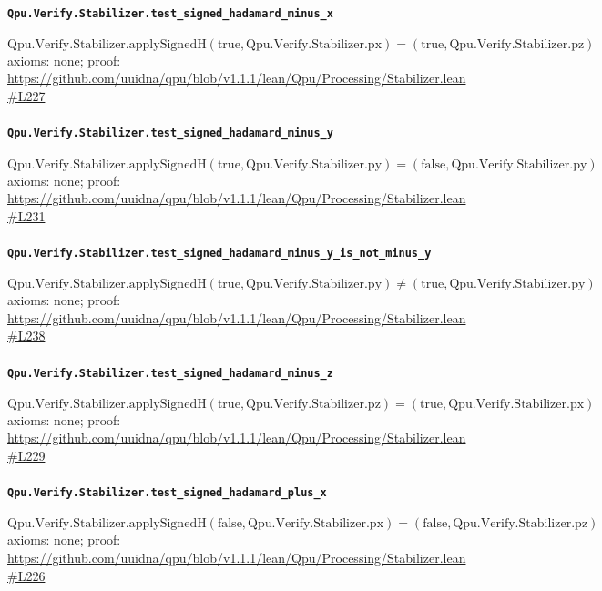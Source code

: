 \documentclass[11pt]{article}
\begin{document}
\paragraph{\texttt{Qpu.Verify.Stabilizer.test\_signed\_hadamard\_minus\_x}}
\[ \mathrm{Qpu.Verify.Stabilizer.applySignedH} (\mathrm{true}, \mathrm{Qpu.Verify.Stabilizer.px}) = (\mathrm{true}, \mathrm{Qpu.Verify.Stabilizer.pz}) \]
\noindent axioms: none; proof: \url{https://github.com/uuidna/qpu/blob/v1.1.1/lean/Qpu/Processing/Stabilizer.lean\#L227}

\paragraph{\texttt{Qpu.Verify.Stabilizer.test\_signed\_hadamard\_minus\_y}}
\[ \mathrm{Qpu.Verify.Stabilizer.applySignedH} (\mathrm{true}, \mathrm{Qpu.Verify.Stabilizer.py}) = (\mathrm{false}, \mathrm{Qpu.Verify.Stabilizer.py}) \]
\noindent axioms: none; proof: \url{https://github.com/uuidna/qpu/blob/v1.1.1/lean/Qpu/Processing/Stabilizer.lean\#L231}

\paragraph{\texttt{Qpu.Verify.Stabilizer.test\_signed\_hadamard\_minus\_y\_is\_not\_minus\_y}}
\[ \mathrm{Qpu.Verify.Stabilizer.applySignedH} (\mathrm{true}, \mathrm{Qpu.Verify.Stabilizer.py}) \ne (\mathrm{true}, \mathrm{Qpu.Verify.Stabilizer.py}) \]
\noindent axioms: none; proof: \url{https://github.com/uuidna/qpu/blob/v1.1.1/lean/Qpu/Processing/Stabilizer.lean\#L238}

\paragraph{\texttt{Qpu.Verify.Stabilizer.test\_signed\_hadamard\_minus\_z}}
\[ \mathrm{Qpu.Verify.Stabilizer.applySignedH} (\mathrm{true}, \mathrm{Qpu.Verify.Stabilizer.pz}) = (\mathrm{true}, \mathrm{Qpu.Verify.Stabilizer.px}) \]
\noindent axioms: none; proof: \url{https://github.com/uuidna/qpu/blob/v1.1.1/lean/Qpu/Processing/Stabilizer.lean\#L229}

\paragraph{\texttt{Qpu.Verify.Stabilizer.test\_signed\_hadamard\_plus\_x}}
\[ \mathrm{Qpu.Verify.Stabilizer.applySignedH} (\mathrm{false}, \mathrm{Qpu.Verify.Stabilizer.px}) = (\mathrm{false}, \mathrm{Qpu.Verify.Stabilizer.pz}) \]
\noindent axioms: none; proof: \url{https://github.com/uuidna/qpu/blob/v1.1.1/lean/Qpu/Processing/Stabilizer.lean\#L226}
\end{document}
